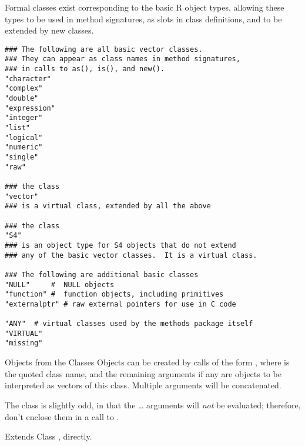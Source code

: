 %
\begin{Description}\relax
Formal classes exist corresponding to the basic R object types, allowing
these types to be used in method signatures, as slots in class
definitions, and to be extended by new classes.
\end{Description}
%
\begin{Usage}
\begin{verbatim}
### The following are all basic vector classes.
### They can appear as class names in method signatures,
### in calls to as(), is(), and new().
"character"
"complex"
"double"
"expression"
"integer"
"list"
"logical"
"numeric"
"single"
"raw"

### the class
"vector"
### is a virtual class, extended by all the above

### the class
"S4"
### is an object type for S4 objects that do not extend
### any of the basic vector classes.  It is a virtual class.

### The following are additional basic classes
"NULL"     #  NULL objects
"function" #  function objects, including primitives
"externalptr" # raw external pointers for use in C code

"ANY"  # virtual classes used by the methods package itself
"VIRTUAL"
"missing"
\end{verbatim}
\end{Usage}
%
\begin{Section}{Objects from the Classes}
Objects can be created by calls of the form ,
where  is the quoted class name, and the remaining
arguments if any are objects to be interpreted as vectors of this
class.  Multiple arguments will be concatenated.

The class  is slightly odd, in that the \dots
arguments will \emph{not} be evaluated; therefore, don't enclose them
in a call to .
\end{Section}
%
\begin{Section}{Extends}
Class , directly.
\end{Section}
